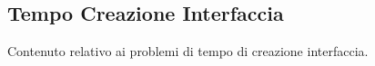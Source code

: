 \subsection{Tempo Creazione Interfaccia}

Contenuto relativo ai problemi di tempo di creazione interfaccia.
